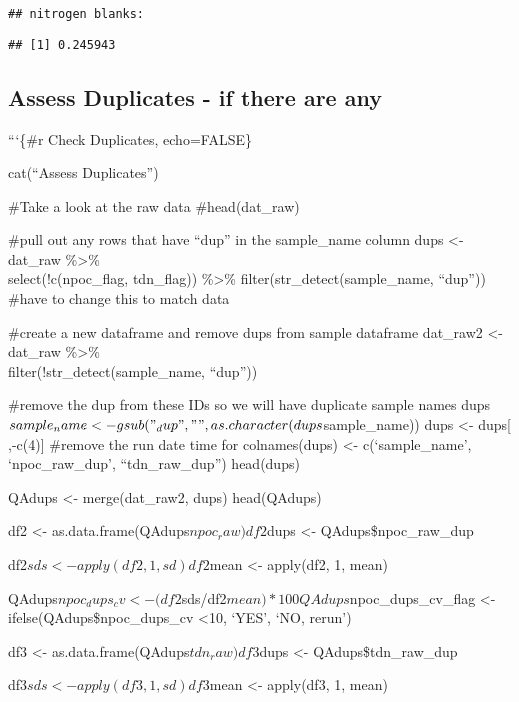 \documentclass[
]{article}
\begin{document}
\begin{verbatim}
## nitrogen blanks:
\end{verbatim}

\begin{verbatim}
## [1] 0.245943
\end{verbatim}

\newpage

\hypertarget{assess-duplicates---if-there-are-any}{%
\subsection{Assess Duplicates - if there are
any}\label{assess-duplicates---if-there-are-any}}

```\{\#r Check Duplicates, echo=FALSE\}

cat(``Assess Duplicates'')

\#Take a look at the raw data \#head(dat\_raw)

\#pull out any rows that have ``dup'' in the sample\_name column dups
\textless- dat\_raw \%\textgreater\%\\
select(!c(npoc\_flag, tdn\_flag)) \%\textgreater\%
filter(str\_detect(sample\_name, ``dup'')) \#have to change this to
match data

\#create a new dataframe and remove dups from sample dataframe dat\_raw2
\textless- dat\_raw \%\textgreater\%\\
filter(!str\_detect(sample\_name, ``dup''))

\#remove the dup from these IDs so we will have duplicate sample names
dups\(sample_name<-gsub("_dup","",as.character(dups\)sample\_name)) dups
\textless- dups{[} ,-c(4){]} \#remove the run date time for
colnames(dups) \textless- c(`sample\_name', `npoc\_raw\_dup',
``tdn\_raw\_dup'') head(dups)

QAdups \textless- merge(dat\_raw2, dups) head(QAdups)

df2 \textless- as.data.frame(QAdups\(npoc_raw) df2\)dups \textless-
QAdups\$npoc\_raw\_dup

df2\(sds <- apply(df2,1,sd) df2\)mean \textless- apply(df2, 1, mean)

QAdups\(npoc_dups_cv <- (df2\)sds/df2\(mean) * 100 QAdups\)npoc\_dups\_cv\_flag
\textless- ifelse(QAdups\$npoc\_dups\_cv \textless10, `YES', `NO,
rerun')

df3 \textless- as.data.frame(QAdups\(tdn_raw) df3\)dups \textless-
QAdups\$tdn\_raw\_dup

df3\(sds <- apply(df3,1,sd) df3\)mean \textless- apply(df3, 1, mean)
\end{document}

